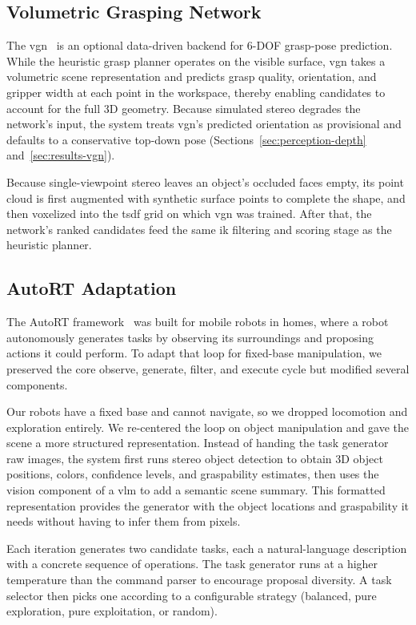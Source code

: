 \subsection{Volumetric Grasping Network}\label{sec:vgn}
The \gls{vgn}~\cite{breyer2021volumetricgraspingnetworkrealtime} is an optional data-driven backend for 6-DOF grasp-pose prediction. While the heuristic grasp planner operates on the visible surface, \gls{vgn} takes a volumetric scene representation and predicts grasp quality, orientation, and gripper width at each point in the workspace, thereby enabling candidates to account for the full 3D geometry. Because simulated stereo degrades the network’s input, the system treats \gls{vgn}’s predicted orientation as provisional and defaults to a conservative top-down pose (Sections~\ref{sec:perception-depth} and~\ref{sec:results-vgn}).

Because single-viewpoint stereo leaves an object's occluded faces empty, its point cloud is first augmented with synthetic surface points to complete the shape, and then voxelized into the \gls{tsdf} grid on which \gls{vgn} was trained. After that, the network's ranked candidates feed the same \gls{ik} filtering and scoring stage as the heuristic planner.

\subsection{AutoRT Adaptation}\label{sec:autort}
The AutoRT framework~\cite{ahn2024autortembodiedfoundationmodels} was built for mobile robots in homes, where a robot autonomously generates tasks by observing its surroundings and proposing actions it could perform. To adapt that loop for fixed-base manipulation, we preserved the core observe, generate, filter, and execute cycle but modified several components.

Our robots have a fixed base and cannot navigate, so we dropped locomotion and exploration entirely. We re-centered the loop on object manipulation and gave the scene a more structured representation. Instead of handing the task generator raw images, the system first runs stereo object detection to obtain 3D object positions, colors, confidence levels, and graspability estimates, then uses the vision component of a \gls{vlm} to add a semantic scene summary. This formatted representation provides the generator with the object locations and graspability it needs without having to infer them from pixels.

Each iteration generates two candidate tasks, each a natural-language description with a concrete sequence of operations. The task generator runs at a higher temperature than the command parser to encourage proposal diversity. A task selector then picks one according to a configurable strategy (balanced, pure exploration, pure exploitation, or random).

